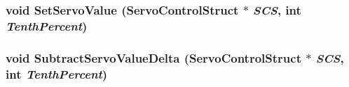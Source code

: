 \subsubsection{\setlength{\rightskip}{0pt plus 5cm}void Set\-Servo\-Value ({\bf Servo\-Control\-Struct} $\ast$ {\em SCS}, int {\em Tenth\-Percent})}\label{_servo_controller_8c_9583f970a0d47759a89616085f9a8636}


\subsubsection{\setlength{\rightskip}{0pt plus 5cm}void Subtract\-Servo\-Value\-Delta ({\bf Servo\-Control\-Struct} $\ast$ {\em SCS}, int {\em Tenth\-Percent})}\label{_servo_controller_8c_75963473d80fc1f78554f52e05bdd00c}


